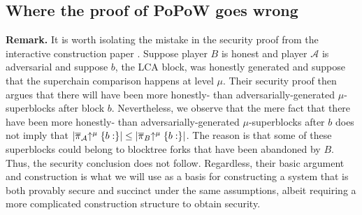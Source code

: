 \subsection{Where the proof of PoPoW goes wrong}
\textbf{Remark.} It is worth isolating the mistake in the security proof from
the interactive construction paper \cite{KLS}. Suppose player $B$ is honest and
player $\mathcal{A}$ is adversarial and suppose $b$, the LCA block, was honestly
generated and suppose that the superchain comparison happens at level $\mu$.
Their security proof then argues that there will have been more honestly- than
adversarially-generated $\mu$-superblocks after block $b$. Nevertheless, we
observe that the mere fact that there have been more honestly- than
adversarially-generated $\mu$-superblocks after $b$ does not imply that
$|\overline\pi_\mathcal{A}\negthickspace\uparrow^\mu\{b:\}| \leq |\overline\pi_B\negthickspace\uparrow^\mu\{b:\}|$. The
reason is that some of these superblocks could belong to blocktree forks that
have been abandoned by $B$. Thus, the security conclusion does not follow.
Regardless, their basic argument and construction is what we will use as a basis
for constructing a system that is both provably secure and succinct under the
same assumptions, albeit requiring a more complicated construction structure to
obtain security.

